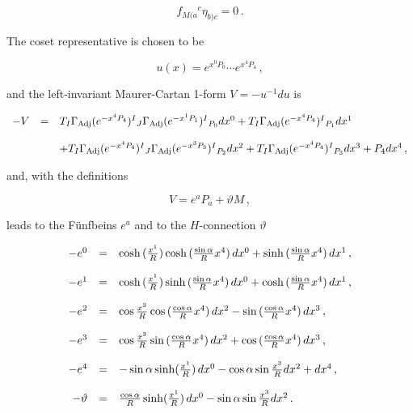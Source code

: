 \documentclass[12pt,a4paper]{article}
\begin{document}
\begin{equation}
f_{M(a}{}^{c}\eta_{b)c}=0\, .
\end{equation}

The coset representative is chosen to be

\begin{equation}
u(x)=e^{x^{0}P_{0}}\cdots e^{x^{4}P_{4}}\, ,  
\end{equation}

\noindent
and the left-invariant Maurer-Cartan 1-form $V=-u^{-1}du$
is%

\begin{equation}
  \begin{array}{rcl}
-V & = & 
T_{I}\Gamma_{\rm Adj}(e^{-x^{4}P_{4}})^{I}{}_{J}
\Gamma_{\rm Adj}(e^{-x^{1}P_{1}})^{I}{}_{P_{0}}dx^{0}
+T_{I}\Gamma_{\rm Adj}(e^{-x^{4}P_{4}})^{I}{}_{P_{1}}dx^{1}\\
& & \\
& &  
+T_{I}\Gamma_{\rm Adj}(e^{-x^{4}P_{4}})^{I}{}_{J}
\Gamma_{\rm Adj}(e^{-x^{3}P_{3}})^{I}{}_{P_{2}}dx^{2}
+T_{I}\Gamma_{\rm Adj}(e^{-x^{4}P_{4}})^{I}{}_{P_{3}}dx^{3}
+P_{4}dx^{4}\, ,\\
\end{array}
\end{equation}

\noindent
and, with the definitions

\begin{equation}
V=e^{a}P_{a}+\vartheta M\, ,  
\end{equation}

\noindent
leads to the F\"unfbeins $e^{a}$ and to the $H$-connection $\vartheta$

\begin{equation}
  \begin{array}{rcl}
-e^{0} & = & 
{\rm cosh}\, (\frac{x^{1}}{R})\, 
{\rm cosh}\, (\frac{\sin{\alpha}}{R}x^{4})\, dx^{0}
+{\rm sinh}\, (\frac{\sin{\alpha}}{R}x^{4})\, dx^{1}\, ,\\
& & \\
-e^{1} & = & 
{\rm cosh}\, (\frac{x^{1}}{R})\, 
{\rm sinh}\, (\frac{\sin{\alpha}}{R}x^{4})\, dx^{0}
+{\rm cosh}\, (\frac{\sin{\alpha}}{R}x^{4})\, dx^{1}\, ,\\
& & \\
-e^{2} & = & 
\cos{\frac{x^{3}}{R}}\cos{(\frac{\cos{\alpha}}{R}x^{4})}\, dx^{2}
-\sin{(\frac{\cos{\alpha}}{R}x^{4})}\, dx^{3}\, ,\\
& & \\
-e^{3} & = & 
\cos{\frac{x^{3}}{R}}\sin{(\frac{\cos{\alpha}}{R}x^{4})}\, dx^{2}
+\cos{(\frac{\cos{\alpha}}{R}x^{4})}\, dx^{3}\, ,\\
& & \\
-e^{4} & = & 
-\sin{\alpha}\, {\rm sinh}(\frac{x^{1}}{R})\, dx^{0}
-\cos{\alpha}\sin{\frac{x^{3}}{R}}dx^{2}+dx^{4}\, ,\\
& & \\
-\vartheta & = & 
\frac{\cos{\alpha}}{R}\, {\rm sinh}(\frac{x^{1}}{R})\, dx^{0}
-\sin{\alpha}\sin{\frac{x^{3}}{R}}dx^{2}\, .\\
  \end{array}
\end{equation}
\end{document}
